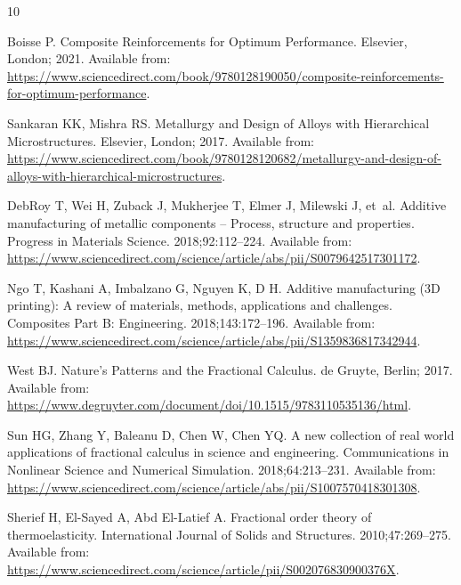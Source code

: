 \documentclass{elsarticle}
\theoremstyle{definition}
\begin{document}
\begin{thebibliography}{10}

Boisse P.
\newblock Composite Reinforcements for Optimum Performance.
\newblock Elsevier, London; 2021.
\newblock Available from:
  \url{https://www.sciencedirect.com/book/9780128190050/composite-reinforcements-for-optimum-performance}.

Sankaran KK, Mishra RS.
\newblock Metallurgy and Design of Alloys with Hierarchical Microstructures.
\newblock Elsevier, London; 2017.
\newblock Available from:
  \url{https://www.sciencedirect.com/book/9780128120682/metallurgy-and-design-of-alloys-with-hierarchical-microstructures}.

DebRoy T, Wei H, Zuback J, Mukherjee T, Elmer J, Milewski J, et~al.
\newblock Additive manufacturing of metallic components – Process, structure
  and properties.
\newblock Progress in Materials Science. 2018;92:112--224.
\newblock Available from:
  \url{https://www.sciencedirect.com/science/article/abs/pii/S0079642517301172}.

Ngo T, Kashani A, Imbalzano G, Nguyen K, D H.
\newblock Additive manufacturing (3D printing): A review of materials, methods,
  applications and challenges.
\newblock Composites Part B: Engineering. 2018;143:172--196.
\newblock Available from:
  \url{https://www.sciencedirect.com/science/article/abs/pii/S1359836817342944}.

West BJ.
\newblock Nature’s Patterns and the Fractional Calculus.
\newblock de Gruyte, Berlin; 2017.
\newblock Available from:
  \url{https://www.degruyter.com/document/doi/10.1515/9783110535136/html}.

Sun HG, Zhang Y, Baleanu D, Chen W, Chen YQ.
\newblock A new collection of real world applications of fractional calculus in
  science and engineering.
\newblock Communications in Nonlinear Science and Numerical Simulation.
  2018;64:213--231.
\newblock Available from:
  \url{https://www.sciencedirect.com/science/article/abs/pii/S1007570418301308}.

Sherief H, El-Sayed A, Abd El-Latief A.
\newblock Fractional order theory of thermoelasticity.
\newblock International Journal of Solids and Structures. 2010;47:269–275.
\newblock Available from:
  \url{https://www.sciencedirect.com/science/article/pii/S002076830900376X}.


\end{thebibliography}
\end{document}
